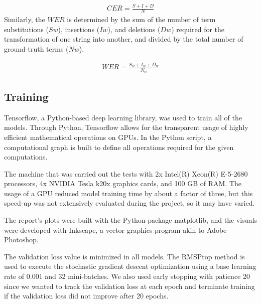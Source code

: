 \documentclass[preprint,12pt]{elsarticle}
\begin{document}
\begin{equation}
\begin{split}
CER = \frac{S+I+D}{N}	
\end{split}
\end{equation}
Similarly, the $WER$ is determined by the sum of the number of term substitutions ($S w$), insertions ($I w$), and deletions ($D w$) required for the transformation of one string into another, and divided by the total number of ground-truth terms ($N w$). 

\begin{equation}
\begin{split}
WER = \frac{S_w + I_w + D_w}{N_w}	
\end{split}
\end{equation}

\subsection{Training}
Tensorflow\cite{abadi2016tensorflow}, a Python-based deep learning library, was used to train all of the models. Through Python, Tensorflow allows for the transparent usage of highly efficient mathematical operations on GPUs. In the Python script, a computational graph is built to define all operations required for the given computations.

The machine that was carried out the tests with 2x Intel(R) Xeon(R) E-5-2680 processors, 4x NVIDIA Tesla k20x graphics cards, and 100 GB of RAM. The usage of a GPU reduced model training time by about a factor of three, but this speed-up was not extensively evaluated during the project, so it may have varied.

The report's plots were built with the Python package matplotlib, and the visuals were developed with Inkscape, a vector graphics program akin to Adobe Photoshop.

The validation loss value is minimized in all models. The RMSProp method\cite{hinton2012neural} is used to execute the stochastic gradient descent optimization using a base learning rate of 0.001 and 32 mini-batches. We also used early stopping with patience 20 since we wanted to track the validation loss at each epoch and terminate training if the validation loss did not improve after 20 epochs.
\end{document}
